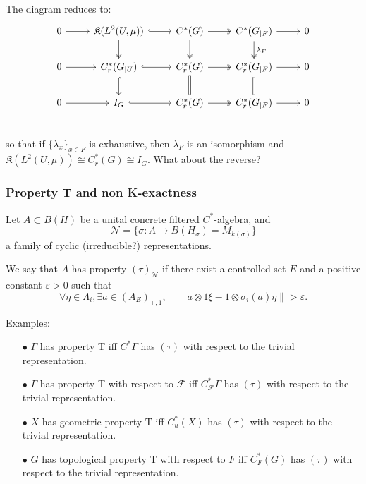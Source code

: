 The diagram reduces to:
\[\begin{tikzcd}
0 \arrow{r} & \mathfrak K(L^2(U,\mu)) \arrow[r,hook] \arrow[d, two heads] & C^*(G)\arrow[r, two heads] \arrow[d, two heads] & C^*(G_{|F})\arrow{r} \arrow[d, two heads, "\lambda_F" ] & 0 \\
0 \arrow{r} &  C_r^*(G_{|U})\arrow[r,hook] \arrow[d,hook] & C_r^*(G)\arrow[r, two heads]  \arrow[d,equal] & C_r^*(G_{|F})\arrow{r} \arrow[d,equal] & 0 \\
0 \arrow{r} &  I_G \arrow[r,hook] & C_r^*(G)\arrow[r, two heads] & C_r^*(G_{|F})\arrow{r} & 0 \\
\end{tikzcd}\]
so that if $\{\lambda_x\}_{x\in F}$ is exhaustive, then $\lambda_F$ is an isomorphism and $\mathfrak K(L^2(U,\mu))\cong C^*_r(G) \cong I_G$. What about the reverse?
\newpage

\subsubsection*{Property T and non K-exactness}%

Let $A \subset B(H)$ be a unital concrete filtered $C^*$-algebra, and 
\[\mathcal N = \{\sigma : A \rightarrow B(H_\sigma) = M_{k(\sigma)}\}\]
a family of cyclic (irreducible?) representations.
\begin{definition}
We say that $A$ has property $(\tau )_{\mathcal N}$ if there exist a controlled set $E$ and a positive constant $\varepsilon>0$ such that 
\[\forall \eta \in \Lambda_{i}, \exists a\in (A_E)_{+,1}, \quad \| a \otimes 1 \xi - 1 \otimes \sigma_i(a) \eta  \| > \varepsilon . \]
\end{definition}

Examples: 
\begin{itemize}
\item[$\bullet$] $\Gamma$ has property T iff $C^*\Gamma$ has $(\tau)$ with respect to the trivial representation.
\item[$\bullet$] $\Gamma$ has property T with respect to $\mathcal F$ iff $C_{\mathcal F}^*\Gamma$ has $(\tau)$ with respect to the trivial representation.
\item[$\bullet$] $X$ has geometric property T iff $C^*_u(X)$ has $(\tau)$ with respect to the trivial representation.
\item[$\bullet$] $G$ has topological property T with respect to $F$ iff $C^*_F(G)$ has $(\tau)$ with respect to the trivial representation.
\end{itemize}

